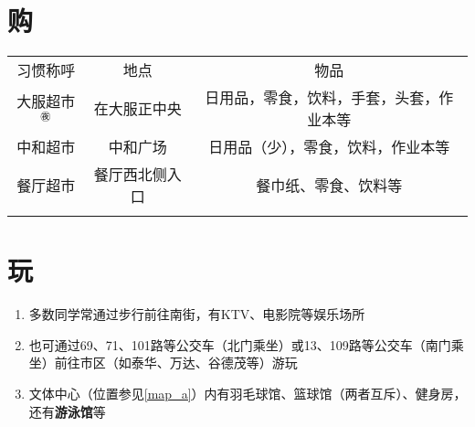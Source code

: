 \section[购]{购}
\label{market}
\begin{table}[H]
    \centering
    \begin{tabular}{|c|c|c|}
        \Xhline{1.2pt}
        习惯称呼       & 地点      & 物品                   \\
        \Xhline{1.2pt}
        大服超市$^{㊰}$ & 在大服正中央  & 日用品，零食，饮料，手套，头套，作业本等 \\
        \hline
        中和超市       & 中和广场    & 日用品（少），零食，饮料，作业本等        \\
        \hline
        餐厅超市       & 餐厅西北侧入口 & 餐巾纸、零食、饮料等               \\
        \Xhline{1.2pt}
    \end{tabular}
\end{table}

\section[玩]{玩}
\begin{enumerate}
    \item 多数同学常通过步行前往南街，有KTV、电影院等娱乐场所
    \item 也可通过69、71、101路等公交车（北门乘坐）或13、109路等公交车（南门乘坐）前往市区（如泰华、万达、谷德茂等）游玩
    \item 文体中心（位置参见\uline{\ref{map_a}}）内有羽毛球馆、篮球馆（两者互斥）、健身房，还有\textbf{游泳馆}等\footnotemark
\end{enumerate}

